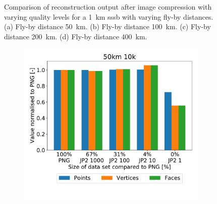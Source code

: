 \begin{figure}[htb]
\begin{subfigure}[b]{0.49\textwidth}
            \caption{}
            \label{fig:recon_120_400_1}
        \end{subfigure}
    \caption{Comparison of reconstruction output after image compression with varying quality levels for a \SI{1}{\kilo\meter} \gls{sssb} with varying fly-by distances. (a) Fly-by distance \SI{50}{\kilo\meter}. (b) Fly-by distance \SI{100}{\kilo\meter}. (c) Fly-by distance \SI{200}{\kilo\meter}. (d) Fly-by distance \SI{400}{\kilo\meter}.}
    \label{fig:recon_stats_1}
\end{figure}

\begin{figure}[htb]
    \centering
        \begin{subfigure}[b]{0.49\textwidth}
            \centering
            \includegraphics[width=\textwidth]{doc/thesis/0_figures/recon/50km_10k}
            \caption{}
            \label{fig:recon_120_50_10}
        \end{subfigure}
        \begin{subfigure}[b]{0.49\textwidth}
            \centering

\end{subfigure}
\end{figure}
